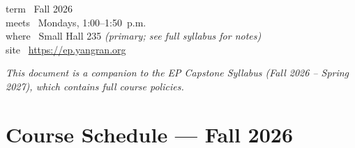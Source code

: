 \documentclass[11pt, letterpaper]{article}
\begin{document}
\addto{}


\begin{infocard}
term  \textbar\ Fall 2026\\
meets \textbar\ Mondays, 1:00--1:50~p.m.\\
where \textbar\ Small Hall 235 \textit{\ttfamily(primary; see full syllabus for notes)}\\
site  \textbar\ \url{https://ep.yangran.org}
\end{infocard}

\vspace{1ex}
{\footnotesize\itshape\color{labMauveDark}This document is a companion to the EP Capstone Syllabus (Fall 2026 -- Spring 2027), which contains full course policies.}

\section{Course Schedule --- Fall 2026}
\end{document}
